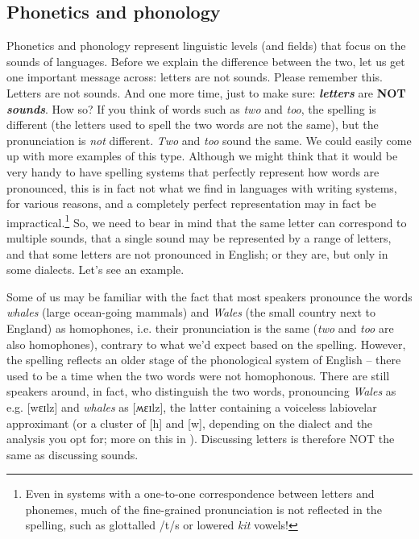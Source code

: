 \subsection{Phonetics and phonology}\label{phonphon}
Phonetics and phonology represent linguistic levels (and fields) that focus on the sounds of languages. Before we explain the difference between the two, let us get one important message across: letters are not sounds. Please remember this. Letters are not sounds. And one more time, just to make sure: \textit{\textbf{letters}} are \textbf{NOT} \textit{\textbf{sounds}}. How so? If you think of words such as \emph{two} and \emph{too}, the spelling is different (the letters used to spell the two words are not the same), but the pronunciation is \emph{not} different. \emph{Two} and \emph{too} sound the same. We could easily come up with more examples of this type. Although we might think that it would be very handy to have spelling systems that perfectly represent how words are pronounced, this is in fact not what we find in languages with writing systems, for various reasons, and a completely perfect representation may in fact be impractical.\footnote{Even in systems with a one-to-one correspondence between letters and phonemes, much of the fine-grained pronunciation is not reflected in the spelling, such as glottalled /t/s or lowered \emph{kit} vowels!} 
So, we need to bear in mind that the same letter can correspond to multiple sounds, that a single sound may be represented by a range of letters, and that some letters are not pronounced in English; or they are, but only in some dialects. Let's see an example.

Some of us may be familiar with the fact that most speakers pronounce the words \emph{whales} (large ocean-going mammals) and \emph{Wales} (the small country next to England) as homophones, i.e. their pronunciation is the same (\emph{two} and \emph{too} are also homophones), contrary to what we'd expect based on the spelling. However, the spelling reflects an older stage of the phonological system of English -- there used to be a time when the two words were not homophonous. There are still speakers around, in fact, who distinguish the two words, pronouncing \emph{Wales} as e.g. [wɛɪlz] and \emph{whales} as [ʍɛɪlz], the latter containing a voiceless labiovelar approximant (or a cluster of [h] and [w], depending on the dialect and the analysis you opt for; more on this in ). Discussing letters is therefore NOT the same as discussing sounds.

